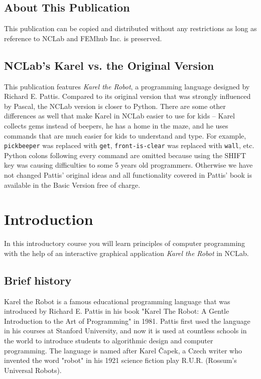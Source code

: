 \documentclass[article,A4,12pt]{llncs}
\begin{document}
\subsection*{About This Publication}
This publication can be copied and distributed without any restrictions
as long as reference to NCLab and FEMhub Inc. is preserved.

\subsection*{NCLab's Karel vs. the Original Version}
This publication features {\em Karel the Robot}, a programming language 
designed by Richard E. Pattis. Compared to its original version that was
strongly influenced by Pascal, the NCLab version is closer to Python.
There are some other differences as well that make Karel in NCLab easier to use 
for kids -- Karel collects gems instead of beepers, he has a home in the 
maze, and he uses commands that are much easier for kids to understand
and type. For example, {\tt pickbeeper} was replaced with {\tt get}, 
{\tt front-is-clear} was replaced with {\tt wall}, etc. Python 
colons following every command are omitted because using the SHIFT key 
was causing difficulties to some 5 years old programmers. 
Otherwise we have not changed Pattis' original ideas and all functionality 
covered in Pattis' book is available in the Basic Version free of charge. 

\normalsize

\newpage
\setcounter{tocdepth}{2}
\tableofcontents

\newpage

\pagestyle{plain}
\setcounter{page}{1}


\section{Introduction}

In this introductory course you will learn principles of computer programming with the 
help of an interactive graphical application {\em Karel the Robot} in NCLab. 

\subsection{Brief history}

Karel the Robot is a famous educational programming language that was introduced by Richard E. 
Pattis in his book "Karel The Robot: A Gentle Introduction to the Art of Programming" in 1981. 
Pattis first used the language in his courses at Stanford University, and now it is used at 
countless schools in the world to introduce students to algorithmic design and computer programming. 
The language is named after Karel \v{C}apek, a Czech writer who invented the word "robot" in his 1921 
science fiction play R.U.R. (Rossum's Universal Robots).
\end{document}
